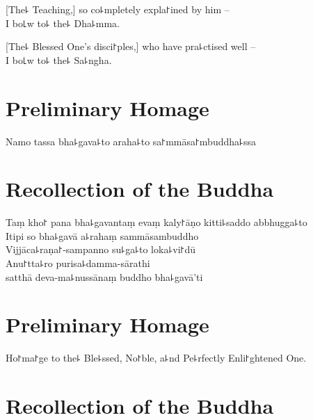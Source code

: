 [The꜕ Teaching,] so co꜕mpletely expla꜓ined by him --\\
I bo꜖w to꜕ the꜕ Dha꜕mma. 

[The꜕ Blessed One's disci꜓ples,] who have pra꜕ctised well --\\
I bo꜖w to꜕ the꜕ Sa꜕ngha. 

\clearpage

\chapter{Preliminary Homage}%

\begin{leader}
\end{leader}

Namo tassa bha꜕gava꜕to araha꜕to sa꜓mmāsa꜓mbuddha꜕ssa


\chapter{Recollection of the Buddha}%

\begin{leader}
\end{leader}

Taṃ kho꜓ pana bha꜕gavantaṃ evaṃ kaly꜓āṇo kitti꜕saddo abbhugga꜕to\\
Itipi so bha꜕gavā a꜕rahaṃ sammāsambuddho\\
Vijjāca꜕raṇa꜓-sampanno su꜕ga꜕to loka꜕vi꜓dū\\
Anu꜓tta꜕ro purisa꜕damma-sārathi\\
\vin satthā deva-ma꜕nussānaṃ buddho bha꜕gavā'ti

\clearpage

\chapter{Preliminary Homage}%

\begin{leader}
\end{leader}

Ho꜓ma꜓ge to the꜕ Ble꜕ssed, No꜓ble, a꜕nd Pe꜕rfectly Enli꜓ghtened One.


\chapter{Recollection of the Buddha}%

